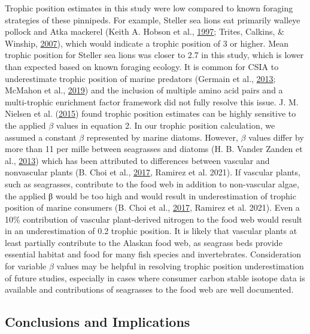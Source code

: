 \documentclass [11pt, proquest] {uwthesis}[2015/03/03]
\begin{document}
Trophic position estimates in this study were low compared to known
foraging strategies of these pinnipeds. For example, Steller sea lions
eat primarily walleye pollock and Atka mackerel (Keith A. Hobson et al.,
\protect\hyperlink{ref-Hobson1997}{1997}; Trites, Calkins, \& Winship,
\protect\hyperlink{ref-Trites2007}{2007}), which would indicate a
trophic position of 3 or higher. Mean trophic position for Steller sea
lions was closer to 2.7 in this study, which is lower than expected
based on known foraging ecology. It is common for CSIA to underestimate
trophic position of marine predators (Germain et al.,
\protect\hyperlink{ref-Germain2013}{2013}; McMahon et al.,
\protect\hyperlink{ref-McMahon2019}{2019}) and the inclusion of multiple
amino acid pairs and a multi-trophic enrichment factor framework did not
fully resolve this issue. J. M. Nielsen et al.
(\protect\hyperlink{ref-Nielsen2015}{2015}) found trophic position
estimates can be highly sensitive to the applied \(\beta\) values in
equation 2. In our trophic position calculation, we assumed a constant
\(\beta\) represented by marine diatoms. However, \(\beta\) values
differ by more than 11 per mille between seagrasses and diatoms (H. B.
Vander Zanden et al., \protect\hyperlink{ref-VanderZanden2013}{2013})
which has been attributed to differences between vascular and
nonvascular plants (B. Choi et al.,
\protect\hyperlink{ref-Choi2017}{2017}, Ramirez et al. 2021). If
vascular plants, such as seagrasses, contribute to the food web in
addition to non-vascular algae, the applied β would be too high and
would result in underestimation of trophic position of marine consumers
(B. Choi et al., \protect\hyperlink{ref-Choi2017}{2017}, Ramirez et al.
2021). Even a 10\% contribution of vascular plant-derived nitrogen to
the food web would result in an underestimation of 0.2 trophic position.
It is likely that vascular plants at least partially contribute to the
Alaskan food web, as seagrass beds provide essential habitat and food
for many fish species and invertebrates. Consideration for variable
\(\beta\) values may be helpful in resolving trophic position
underestimation of future studies, especially in cases where consumer
carbon stable isotope data is available and contributions of seagrasses
to the food web are well documented.

\subsection{Conclusions and
Implications}\label{conclusions-and-implications}
\end{document}
